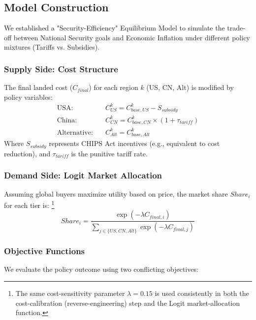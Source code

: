 \documentclass{apmcmthesis}
\begin{document}
\subsection{Model Construction}
We established a "Security-Efficiency" Equilibrium Model to simulate the trade-off between National Security goals and Economic Inflation under different policy mixtures (Tariffs vs. Subsidies).

\subsubsection{Supply Side: Cost Structure}
The final landed cost ($C_{final}$) for each region $k$ (US, CN, Alt) is modified by policy variables:
\begin{align}
    \text{USA:} \quad & C_{US}^k = C_{base, US}^k - S_{subsidy} \\
    \text{China:} \quad & C_{CN}^k = C_{base, CN}^k \times (1 + \tau_{tariff}) \\
    \text{Alternative:} \quad & C_{Alt}^k = C_{base, Alt}^k
\end{align}
Where $S_{subsidy}$ represents CHIPS Act incentives (e.g., equivalent to cost reduction), and $\tau_{tariff}$ is the punitive tariff rate.

\subsubsection{Demand Side: Logit Market Allocation}
Assuming global buyers maximize utility based on price, the market share $Share_i$ for each tier is:
\footnote{The same cost-sensitivity parameter $\lambda=0.15$ is used consistently in both the cost-calibration (reverse-engineering) step and the Logit market-allocation function.}
\begin{equation}
    Share_i = \frac{\exp(-\lambda C_{final, i})}{\sum_{j \in \{US, CN, Alt\}} \exp(-\lambda C_{final, j})}
\end{equation}

\subsubsection{Objective Functions}
We evaluate the policy outcome using two conflicting objectives:
\end{document}
